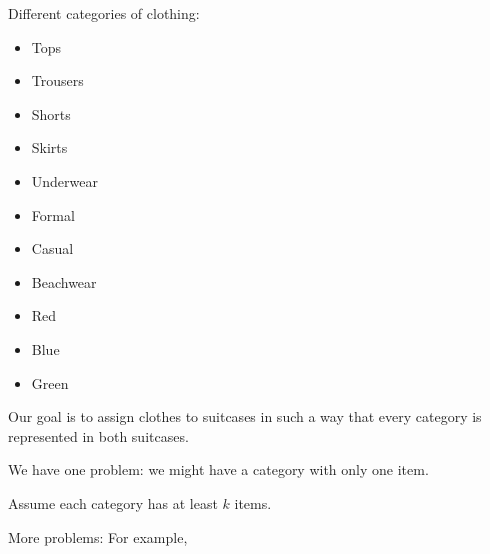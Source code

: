 \documentclass[a4paper,11pt]{amsbook}
\theoremstyle{definition}
\theoremstyle{remark}
\newcommand\0{\varnothing}
\begin{document}
Different categories of clothing:\\
\noindent \begin{minipage}[t]{0.3\textwidth}
\begin{itemize}[leftmargin=*]
  \item Tops
  \item Trousers
  \item Shorts
  \item Skirts
\end{itemize}
\end{minipage}
\begin{minipage}[t]{0.3\textwidth}
\begin{itemize}[leftmargin=*]
  \item Underwear
  \item Formal
  \item Casual
  \item Beachwear
\end{itemize}
\end{minipage}
\begin{minipage}[t]{0.3\textwidth}
\begin{itemize}[leftmargin=*]
  \item Red
  \item Blue
  \item Green\\[5pt]
\end{itemize}
\end{minipage}

Our goal is to assign clothes to suitcases in such a way that every category is represented in both suitcases.

We have one problem: we might have a category with only one item.

Assume each category has at least $k$ items.

More problems: For example, \begin{center}
\end{center}
\end{document}
